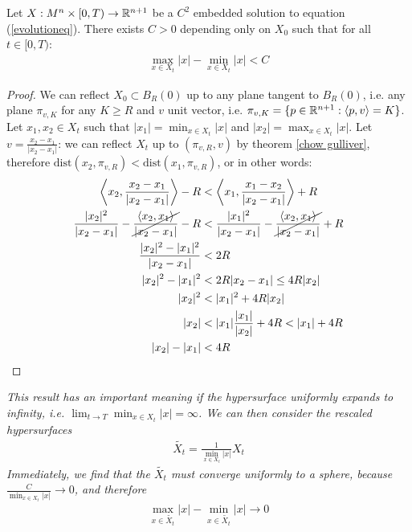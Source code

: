\begin{cor}
	Let $X:M^n\times [0,T) \rightarrow \mathbb{R}^{n+1}$ be a $C^2$ embedded solution to equation (\ref{evolutioneq}). There exists $C>0$ depending only on $X_0$ such that for all $t\in[0, T)$: 
	\begin{align*}
		\max_{x\in X_t} |x| - \min_{x\in X_t} |x| < C
	\end{align*}\label{sandwich estimate}
\end{cor}
\begin{proof}
	We can reflect $X_0\subset B_R(0)$ up to any plane tangent to  $B_R(0)$, i.e. any plane $\pi_{v, K}$ for any $K\geq R$ and $v$ unit vector, i.e.  $\pi_{v, K}=\{p \in \mathbb{R}^{n+1} : \langle p, v \rangle = K\}$. Let $x_1, x_2\in X_t$ such that $|x_1|=\min_{x\in X_t} |x|$ and  $|x_2|=\max_{x\in X_t} |x|$. Let $v=\frac{x_2-x_1}{\vert x_2-x_1 \vert}$: we can reflect $X_t$ up to $(\pi_{v, R}, v)$ by theorem \ref{chow gulliver}, therefore $\mathrm{dist}(x_2, \pi_{v, R}) < \mathrm{dist}(x_1, \pi_{v, R})$, or in other words:
	\begin{align*}
		 \left\langle x_2, \frac{x_2-x_1}{\vert x_2-x_1 \vert} \right\rangle - R &< 
		 \left\langle x_1, \frac{x_1-x_2}{\vert x_2-x_1 \vert} \right\rangle + R\\
		 \frac{|x_2|^2}{\vert x_2-x_1 \vert} - \cancel{\frac{\left\langle x_2, x_1\right\rangle}{\vert x_2-x_1 \vert}}  - R &< 
		 \frac{\vert x_1\vert^2}{\vert x_2-x_1 \vert} - \cancel{\frac{\left\langle x_2, x_1\right\rangle}{\vert x_2-x_1 \vert}}  + R\\
		 \frac{|x_2|^2 - |x_1|^2}{\vert x_2-x_1 \vert} &< 
		  2R\\
		  |x_2|^2 - |x_1|^2 &< 
		  2R \vert x_2-x_1 \vert \leq 4R |x_2|\\
		  |x_2|^2 &<|x_1|^2 + 4R |x_2|\\
		  |x_2| &< |x_1| \frac{|x_1|}{|x_2|} + 4R < |x_1| + 4R\\
		  |x_2| -|x_1| &<4R
	\end{align*}
\end{proof}

\begin{oss}
	\em This result has an important meaning if the hypersurface uniformly expands to infinity, i.e. $\lim_{t\rightarrow T}\min_{x\in X_t} |x| =\infty$. We can then consider the rescaled hypersurfaces 
	\begin{align*}
		\widetilde{X_t} = \frac{1}{\min_{x\in X_t} |x|} X_t
	\end{align*}
	Immediately, we find that  the $\widetilde{X_t}$ must converge uniformly to a sphere, because $\frac{C}{\min_{x\in X_t} |x|}\rightarrow 0$, and therefore 
	\begin{align*}
		\max_{x\in \widetilde{X_t}} |x| - \min_{x\in \widetilde{X_t}}|x|\rightarrow 0
	\end{align*}
\end{oss}

